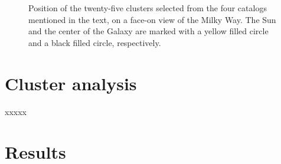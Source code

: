 \documentclass{aa}
\begin{document}
 \begin{figure}
  \caption{Position of the twenty-five clusters selected from the four catalogs
  mentioned in the text, on a face-on view of the Milky Way. The Sun and the
  center of the Galaxy are marked with a yellow filled circle and a black
  filled circle, respectively.}
  \label{fig:MWmap}
 \end{figure}





\section{Cluster analysis}
 \label{sec:clust_analy}

 xxxxx





\section{Results}
 \label{sec:results}
\end{document}
